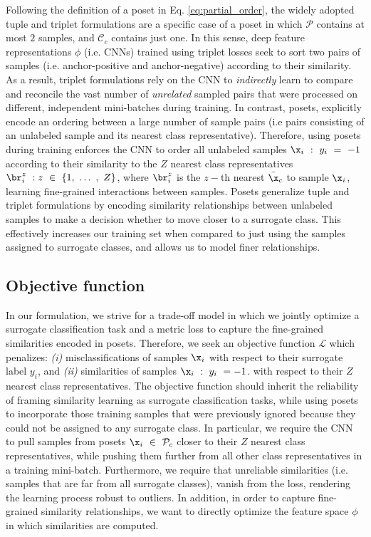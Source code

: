 \documentclass[10pt,twocolumn,letterpaper]{article}
\begin{document}
Following the definition of a poset in Eq. \ref{eq:partial_order}, the widely adopted tuple and triplet formulations \cite{ConvNetpretext1, ConvNetpretext2,shuffleandlearn,Yang_2016_CVPR} are a specific case of a poset in which $\mathcal{P}$ contains at most $2$ samples, and $\mathcal{C}_c$ contains just one. In this sense, deep feature representations $\phi$ (i.e. CNNs) trained using triplet losses seek to sort two pairs of samples (i.e. anchor-positive and anchor-negative) according to their similarity. As a result, triplet formulations rely on the CNN to \textit{indirectly} learn to compare and reconcile the vast number of \textit{unrelated} sampled pairs that were processed on different, independent mini-batches during training. In contrast, posets, explicitly encode an ordering between a large number of sample pairs (i.e pairs consisting of an unlabeled sample and its nearest class representative). Therefore, using posets during training enforces the CNN to order all unlabeled samples $\x_i~:~y_i~=~-1$ according to their similarity to the $Z$ nearest class representatives $\br^z_i~:z~\in~\{1,~\dots~,~Z\}$, where $\br^z_i$ is the $z-$th nearest $\bar{\x}_c$ to sample $\x_i$, learning fine-grained interactions between samples.  Posets generalize tuple and triplet formulations by encoding similarity relationships between unlabeled samples to make a decision whether to move closer to a surrogate class. This effectively increases our training set when compared to just using the samples assigned to surrogate classes, and allows us to model finer relationships.





\subsection{Objective function}

In our formulation, we strive for a trade-off model in which we jointly optimize a surrogate classification task and a metric loss to capture the fine-grained similarities encoded in posets. Therefore, we seek an objective function $\mathcal{L}$ which penalizes: \emph{(i)} misclassifications of samples $\x_i$ with respect to their surrogate label $y_i$, and \emph{(ii)} similarities of samples $\x_i~:~y_i~=-1$. with respect to their $Z$ nearest class representatives. The objective function should inherit the reliability of framing similarity learning as surrogate classification tasks, while using posets to incorporate those training samples that were previously ignored because they could not be assigned to any surrogate class. In particular, we require the CNN to pull samples from posets $\x_i~\in~\mathcal{P}_c$ closer to their $Z$ nearest class representatives, while pushing them further from all other class representatives in a training mini-batch.  Furthermore, we require that unreliable similarities (i.e. samples that are far from all surrogate classes), vanish from the loss, rendering the learning process robust to outliers. In addition, in order to capture fine-grained similarity relationships, we want to directly optimize the feature space $\phi$ in which similarities are computed.
\end{document}
